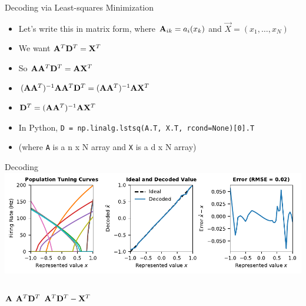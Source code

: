 \documentclass[handout,aspectratio=169]{beamer}
\begin{document}
\begin{frame}{Decoding via Least-squares Minimization}
	\begin{itemize}
		\item Let's write this in matrix form, where ${\mathbf{A}}_{ik} = a_i(x_k)$ and $\vec X = (x_1, \ldots, x_N)$
		\item We want ${\mathbf{A}}^T {\mathbf{D}}^T = {\mathbf{X}}^T$
		\item So ${\mathbf{A}} {\mathbf{A}}^T {\mathbf{D}}^T = {\mathbf{A}} {\mathbf{X}}^T$
		\item $({\mathbf{A}} {\mathbf{A}}^T)^{-1}{\mathbf{A}} {\mathbf{A}}^T {\mathbf{D}}^T = ({\mathbf{A}} {\mathbf{A}}^T)^{-1}{\mathbf{A}} {\mathbf{X}}^T$ 
		\item ${\mathbf{D}}^T = ({\mathbf{A}} {\mathbf{A}}^T)^{-1}{\mathbf{A}} {\mathbf{X}}^T$
		\item In Python, \texttt{D = np.linalg.lstsq(A.T, X.T, rcond=None)[0].T}
		\item (where \texttt{A} is a n x N array and \texttt{X} is a d x N array)
	\end{itemize}
\end{frame}

\begin{frame}{Decoding}
	\includegraphics[width=\textwidth]{media/decoding_example_no_noise.pdf}
	\begin{columns}
		${\mathbf{A}}$
		${\mathbf{A}}^T {\mathbf{D}}^T$
		${\mathbf{A}}^T {\mathbf{D}}^T - {\mathbf{X}}^T$
	\end{columns}
\end{frame}
\end{document}
